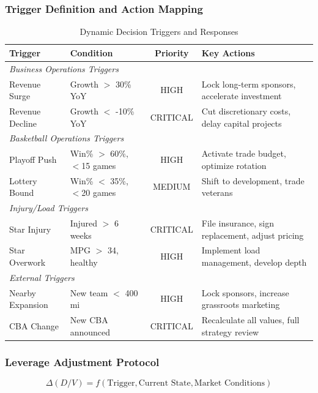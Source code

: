 \documentclass{mcmthesis}
\begin{document}
\subsubsection{Trigger Definition and Action Mapping}

\begin{table}[H]
\centering
\caption{Dynamic Decision Triggers and Responses}
\begin{tabular}{p{3.2cm}p{2.8cm}cp{5.0cm}}
\toprule
\textbf{Trigger} & \textbf{Condition} & \textbf{Priority} & \textbf{Key Actions} \\
\midrule
\multicolumn{4}{l}{\textit{Business Operations Triggers}} \\
Revenue Surge & Growth $>$ 30\% YoY & HIGH & Lock long-term sponsors, accelerate investment \\
Revenue Decline & Growth $<$ -10\% YoY & CRITICAL & Cut discretionary costs, delay capital projects \\
\midrule
\multicolumn{4}{l}{\textit{Basketball Operations Triggers}} \\
Playoff Push & Win\% $>$ 60\%, $<$15 games & HIGH & Activate trade budget, optimize rotation \\
Lottery Bound & Win\% $<$ 35\%, $<$20 games & MEDIUM & Shift to development, trade veterans \\
\midrule
\multicolumn{4}{l}{\textit{Injury/Load Triggers}} \\
Star Injury & Injured $>$ 6 weeks & CRITICAL & File insurance, sign replacement, adjust pricing \\
Star Overwork & MPG $>$ 34, healthy & HIGH & Implement load management, develop depth \\
\midrule
\multicolumn{4}{l}{\textit{External Triggers}} \\
Nearby Expansion & New team $<$ 400 mi & HIGH & Lock sponsors, increase grassroots marketing \\
CBA Change & New CBA announced & CRITICAL & Recalculate all values, full strategy review \\
\bottomrule
\end{tabular}
\end{table}

\subsubsection{Leverage Adjustment Protocol}

\begin{equation}
\Delta(D/V) = f(\text{Trigger}, \text{Current State}, \text{Market Conditions})
\end{equation}
\end{document}
